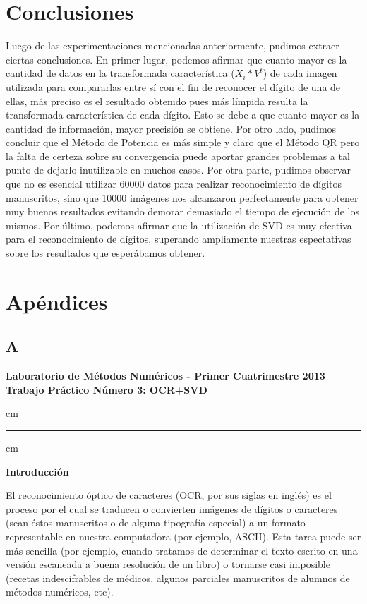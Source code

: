 \documentclass[10pt, a4paper]{article}
\begin{document}
\section{Conclusiones}
Luego de las experimentaciones mencionadas anteriormente, pudimos extraer ciertas conclusiones. En primer lugar, podemos afirmar que cuanto mayor es la cantidad de datos en la transformada característica ($X_{i}*V^t$) de cada imagen utilizada para compararlas entre sí con el fin de reconocer el dígito de una de ellas, más preciso es el resultado obtenido pues más límpida resulta la transformada característica de cada dígito. Esto se debe a que cuanto mayor es la cantidad de información, mayor precisión se obtiene.\newline
Por otro lado, pudimos concluir que el Método de Potencia es más simple y claro que el Método QR pero la falta de certeza sobre su convergencia puede aportar grandes problemas a tal punto de dejarlo inutilizable en muchos casos.\newline
Por otra parte, pudimos observar que no es esencial utilizar 60000 datos para realizar reconocimiento de dígitos manuscritos, sino que 10000 imágenes nos alcanzaron perfectamente para obtener muy buenos resultados evitando demorar demasiado el tiempo de ejecución de los mismos.\newline
Por último, podemos afirmar que la utilización de SVD es muy efectiva para el reconocimiento de dígitos, superando ampliamente nuestras espectativas sobre los resultados que esperábamos obtener.

\section{Ap\'endices}
\subsection{A}

\begin{centering}
\large\bf Laboratorio de M\'etodos Num\'ericos - Primer Cuatrimestre 2013 \\
\large\bf Trabajo Pr\'actico N\'umero 3: OCR+SVD\\
\end{centering}


 cm
\hrule
{} cm

{\bf Introducci\'on}

El reconocimiento \'optico de caracteres (OCR, por sus siglas en ingl\'es) es el proceso por el cual se traducen o convierten im\'agenes de d\'igitos o caracteres (sean \'estos manuscritos o de alguna tipograf\'ia especial) a un formato representable en nuestra computadora (por ejemplo, ASCII). Esta tarea puede ser m\'as sencilla (por ejemplo, cuando tratamos de determinar el texto escrito en una versi\'on escaneada a buena resoluci\'on de un libro) o tornarse casi imposible (recetas indescifrables de m\'edicos, algunos parciales manuscritos de alumnos de m\'etodos num\'ericos, etc).
\end{document}
